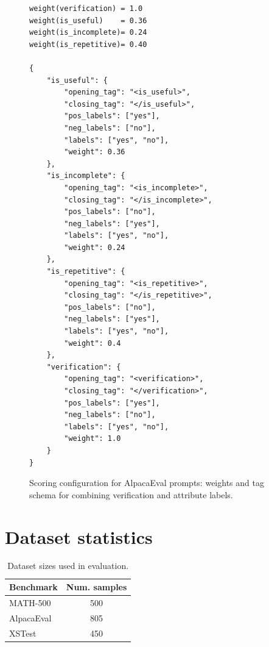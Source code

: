 \documentclass{article}
\theoremstyle{plain}
\theoremstyle{definition}
\theoremstyle{remark}
\begin{document}
\begin{figure}[h]
\centering
\begin{minipage}{0.9\textwidth}
\begin{small}
\begin{verbatim}
weight(verification) = 1.0
weight(is_useful)    = 0.36
weight(is_incomplete)= 0.24
weight(is_repetitive)= 0.40

{
    "is_useful": {
        "opening_tag": "<is_useful>",
        "closing_tag": "</is_useful>",
        "pos_labels": ["yes"],
        "neg_labels": ["no"],
        "labels": ["yes", "no"],
        "weight": 0.36
    },
    "is_incomplete": {
        "opening_tag": "<is_incomplete>",
        "closing_tag": "</is_incomplete>",
        "pos_labels": ["no"],
        "neg_labels": ["yes"],
        "labels": ["yes", "no"],
        "weight": 0.24
    },
    "is_repetitive": {
        "opening_tag": "<is_repetitive>",
        "closing_tag": "</is_repetitive>",
        "pos_labels": ["no"],
        "neg_labels": ["yes"],
        "labels": ["yes", "no"],
        "weight": 0.4
    },
    "verification": {
        "opening_tag": "<verification>",
        "closing_tag": "</verification>",
        "pos_labels": ["yes"],
        "neg_labels": ["no"],
        "labels": ["yes", "no"],
        "weight": 1.0
    }
}
\end{verbatim}
\end{small}
\end{minipage}
\caption{Scoring configuration for AlpacaEval prompts: weights and tag schema for combining verification and attribute labels.}
\label{fig:appendix-qwen-alpaca-config}
\end{figure}

\section{Dataset statistics}
\begin{table}[h]
\caption{Dataset sizes used in evaluation.}
\label{tab:appendix-dataset-stats}
\vskip 0.1in
\centering
\begin{small}
\begin{sc}
\begin{tabular}{lc}
\toprule
Benchmark & Num. samples \\
\midrule
MATH-500 & 500 \\
AlpacaEval & 805 \\
XSTest & 450 \\
\bottomrule
\end{tabular}
\end{sc}
\end{small}
\vskip -0.05in
\end{table}
\end{document}

